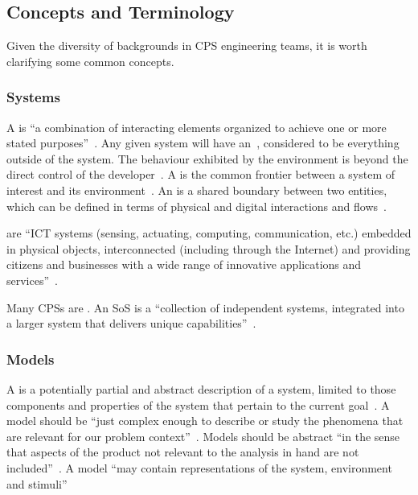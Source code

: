 \subsection{Concepts and Terminology}
\label{sec:method:concepts}

Given the diversity of backgrounds in CPS engineering teams, it is worth clarifying some common concepts.

\subsubsection{Systems}
\label{sec:concepts:systems}
A  is ``a combination of interacting elements organized to achieve one or more stated purposes''~\cite{INCOSEseh15}. Any given system will have an~, considered to be everything outside of the system. The behaviour exhibited by the environment is beyond the direct control of the developer~\cite{Broenink&12b}. A  is the common frontier between a system of interest and its environment~\cite{Broenink&12b}. An  is a shared boundary between two entities, which can be defined in terms of physical and digital interactions and flows~\cite{INCOSEseh15}.


 are ``ICT systems (sensing, actuating, computing, communication, etc.) embedded in physical objects, interconnected (including through the Internet) and providing citizens and businesses with a wide range of innovative applications and services''~\cite{Thompson13, Deka&15}.

Many CPSs are . An SoS is a ``collection of independent systems, integrated into a larger system that delivers unique capabilities''~\cite{INCSOEsosprimer18}.

\subsubsection{Models}
\label{sec:concepts:models}

A  is a  potentially partial and abstract description of a system, limited to those components and properties of the system that pertain to the current goal~\cite{Holt&14}. A model should be ``just complex enough to describe or study the phenomena that are relevant for our problem context''~\cite{Amerongen10}. Models should be abstract ``in the sense that aspects of the product not relevant to the analysis in hand are not included''~\cite{Fitzgerald&98b}. A model ``may contain representations of the system, environment and stimuli''~\cite{Fitzgerald&14c}


